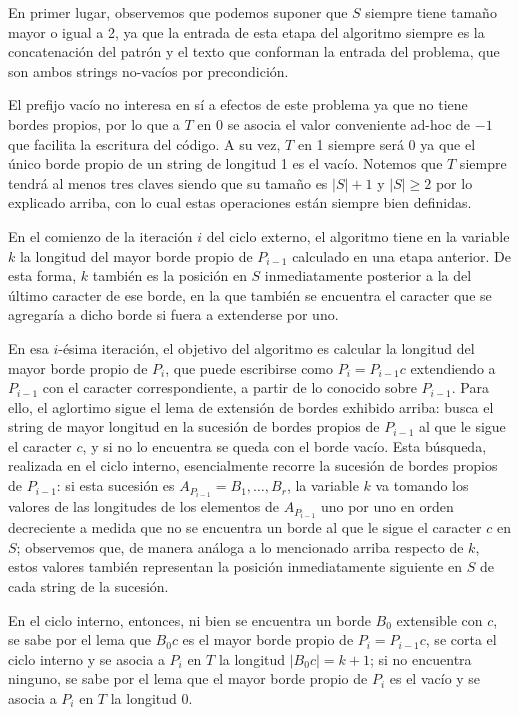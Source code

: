 \bigskip

En primer lugar, observemos que podemos suponer que $S$ siempre tiene tamaño mayor o igual a 2, ya que la entrada de esta etapa del algoritmo siempre es la concatenación del patrón y el texto que conforman la entrada del problema, que son ambos strings no-vacíos por precondición.

El prefijo vacío no interesa en sí a efectos de este problema ya que no tiene bordes propios, por lo que a $T$ en 0 se asocia el valor conveniente ad-hoc de $-1$ que facilita la escritura del código. A su vez, $T$ en 1 siempre será 0 ya que el único borde propio de un string de longitud 1 es el vacío. Notemos que $T$ siempre tendrá al menos tres claves siendo que su tamaño es $|S|+1$ y $|S| \geq 2$ por lo explicado arriba, con lo cual estas operaciones están siempre bien definidas.

En el comienzo de la iteración $i$ del ciclo externo, el algoritmo tiene en la variable $k$ la longitud del mayor borde propio de $P_{i-1}$ calculado en una etapa anterior. De esta forma, $k$ también es la posición en $S$ inmediatamente posterior a la del último caracter de ese borde, en la que también se encuentra el caracter que se agregaría a dicho borde si fuera a extenderse por uno.

En esa $i$-ésima iteración, el objetivo del algoritmo es calcular la longitud del mayor borde propio de $P_i$, que puede escribirse como $P_i = P_{i-1}c$ extendiendo a $P_{i-1}$ con el caracter correspondiente, a partir de lo conocido sobre $P_{i-1}$. Para ello, el aglortimo sigue el lema de extensión de bordes exhibido arriba: busca el string de mayor longitud en la sucesión de bordes propios de $P_{i-1}$ al que le sigue el caracter $c$, y si no lo encuentra se queda con el borde vacío. Esta búsqueda, realizada en el ciclo interno, esencialmente recorre la sucesión de bordes propios de $P_{i-1}$: si esta sucesión es $A_{P_{i-1}} = B_1, \dots, B_r$, la variable $k$ va tomando los valores de las longitudes de los elementos de $A_{P_{i-1}}$ uno por uno en orden decreciente a medida que no se encuentra un borde al que le sigue el caracter $c$ en $S$; observemos que, de manera análoga a lo mencionado arriba respecto de $k$, estos valores también representan la posición inmediatamente siguiente en $S$ de cada string de la sucesión.

En el ciclo interno, entonces, ni bien se encuentra un borde $B_0$ extensible con $c$, se sabe por el lema que $B_{0}c$ es el mayor borde propio de $P_i = P_{i-1}c$, se corta el ciclo interno y se asocia a $P_i$ en $T$ la longitud $|B_{0}c| = k+1$; si no encuentra ninguno, se sabe por el lema que el mayor borde propio de $P_i$ es el vacío y se asocia a $P_i$ en $T$ la longitud 0.

